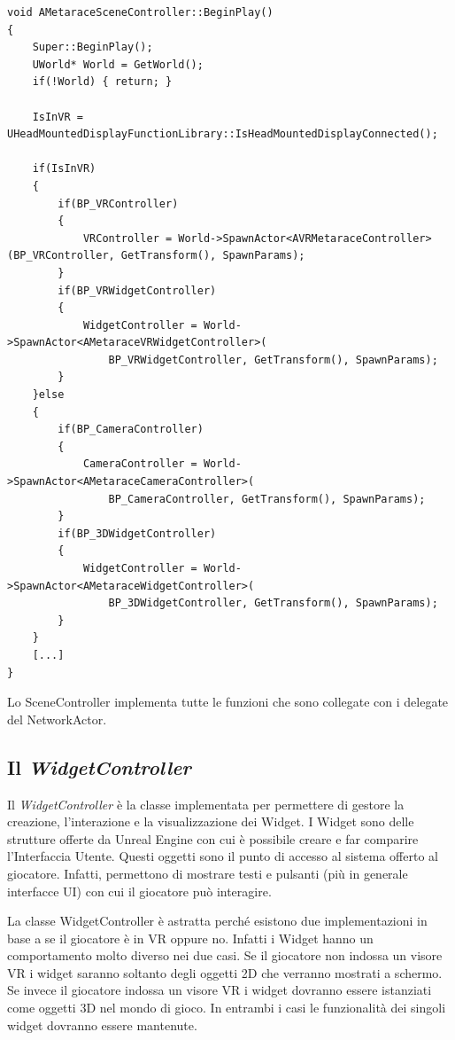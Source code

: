     \begin{lstlisting}[caption = Sezione del source della classe SceneController dove viene fatto il controllo per sapere se il giocatore indossa un visore]
void AMetaraceSceneController::BeginPlay()
{
    Super::BeginPlay();
    UWorld* World = GetWorld();
    if(!World) { return; }

    IsInVR = UHeadMountedDisplayFunctionLibrary::IsHeadMountedDisplayConnected();

    if(IsInVR)
	{
		if(BP_VRController)
		{
			VRController = World->SpawnActor<AVRMetaraceController>(BP_VRController, GetTransform(), SpawnParams);
		}
		if(BP_VRWidgetController)
		{
			WidgetController = World->SpawnActor<AMetaraceVRWidgetController>(
				BP_VRWidgetController, GetTransform(), SpawnParams);
		}
    }else
    {
        if(BP_CameraController)
		{
			CameraController = World->SpawnActor<AMetaraceCameraController>(
				BP_CameraController, GetTransform(), SpawnParams);
		}
		if(BP_3DWidgetController)
		{
			WidgetController = World->SpawnActor<AMetaraceWidgetController>(
				BP_3DWidgetController, GetTransform(), SpawnParams);
		}
    }
    [...]
}        
    \end{lstlisting}

    Lo SceneController implementa tutte le funzioni che sono collegate con i delegate del NetworkActor.

    \subsection{Il \textit{WidgetController}}

    Il \textit{WidgetController} è la classe implementata per permettere di gestore la creazione, l'interazione e la visualizzazione dei Widget.
    I Widget sono delle strutture offerte da Unreal Engine con cui è possibile creare e far comparire l'Interfaccia Utente.
    Questi oggetti sono il punto di accesso al sistema offerto al giocatore.
    Infatti, permettono di mostrare testi e pulsanti (più in generale interfacce UI) con cui il giocatore può interagire.

    La classe WidgetController è astratta perché esistono due implementazioni in base a se il giocatore è in VR oppure no. 
    Infatti i Widget hanno un comportamento molto diverso nei due casi.
    Se il giocatore non indossa un visore VR i widget saranno soltanto degli oggetti 2D che verranno mostrati a schermo.
    Se invece il giocatore indossa un visore VR i widget dovranno essere istanziati come oggetti 3D nel mondo di gioco.
    In entrambi i casi le funzionalità dei singoli widget dovranno essere mantenute.

